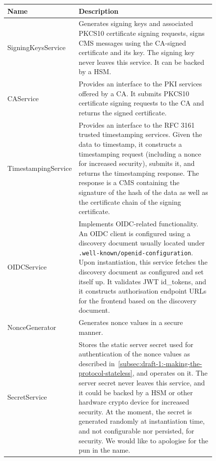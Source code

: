 \begin{figure}[H]
    \begin{center}
        \begin{tabular}{p{4.2cm}|p{12cm}}
            \textbf{Name} & \textbf{Description}
            \\ \hline
            SigningKeysService &
            Generates signing keys and associated \gls{PKCS10} certificate signing requests,
            signs \gls{CMS} messages using the \gls{CA}-signed certificate and its key.
            The signing key never leaves this service.
            It can be backed by a \gls{HSM}.
            \\ \hline
            CAService &
            Provides an interface to the \gls{PKI} services offered by a \gls{CA}.
            It submits \gls{PKCS10} certificate signing requests to the \gls{CA} and returns the signed certificate.
            \\ \hline
            TimestampingService &
            Provides an interface to the RFC 3161 trusted timestamping services.
            Given the data to timestamp, it constructs a timestamping request (including a nonce for increased security),
            submits it, and returns the timestamping response.
            The response is a \gls{CMS} containing the signature of the hash of the data
            as well as the certificate chain of the signing certificate.
            \\ \hline
            OIDCService &
            Implements \gls{OIDC}-related functionality.
            An \gls{OIDC} client is configured using a discovery document usually located under \texttt{.well-known/openid-configuration}.
            Upon instantiation,
            this service fetches the discovery document as configured and set itself up.
            It validates \gls{JWT} id\_tokens,
            and it constructs authorisation endpoint \gls{URL}s for the frontend based on the discovery document.
            \\ \hline
            NonceGenerator &
            Generates nonce values in a secure manner.
            \\ \hline
            SecretService &
            Stores the static server secret used for authentication of the nonce values as described in~\ref{subsec:draft-1:-making-the-protocol-stateless},
            and operates on it.
            The server secret never leaves this service,
            and it could be backed by a \gls{HSM} or other hardware crypto device for increased security.
            At the moment, the secret is generated randomly at instantiation time, and not configurable nor persisted,
            for security.
            We would like to apologise for the pun in the name.
        \end{tabular}
    \end{center}
\end{figure}

